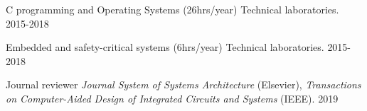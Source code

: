 



\begin{cvhonors}

\cvhonor
{C programming and Operating Systems (26hrs/year)} 
{ Technical laboratories.} %
{} %
{2015-2018} %


\cvhonor
{Embedded and safety-critical systems (6hrs/year)} %
{ Technical laboratories.} %
{} %
{2015-2018} %

\end{cvhonors}



\begin{cvhonors}
	
		
	\cvhonor
	{Journal reviewer} %
	{ \textit{Journal System of Systems Architecture} (Elsevier), \newline
	\textit{Transactions on Computer-Aided Design of Integrated Circuits and 
	Systems} (IEEE).} %
	{} %
	{2019} %
	

	
	
	
\end{cvhonors}



